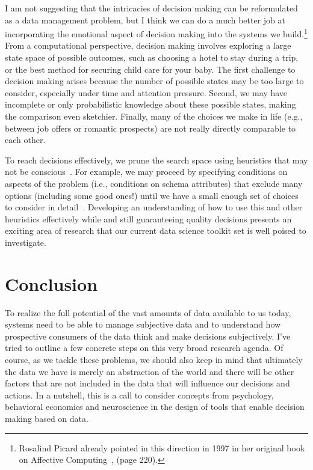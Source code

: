 \documentclass[11pt]{article}
\begin{document}
I am not suggesting that the intricacies of decision making can be reformulated as a data management problem, but I think we can do a much better job at incorporating the emotional aspect of decision making into the systems we build.\footnote{Rosalind Picard already pointed in this direction in 1997 in her original book on Affective Computing~\cite{picard-book}, (page 220).} 
From a computational perspective, decision making involves exploring a large state space of possible outcomes, such as choosing a hotel to stay during a trip, or the best method for securing child care for your baby. The first challenge to decision making arises because the number of possible states may be too large to consider,  especially under time and attention pressure. Second, we may have incomplete or only probabilistic knowledge about these possible states, making the comparison even sketchier. Finally, many of the choices we make in life (e.g., between job offers or romantic prospects) are not really directly comparable  to each other.

To reach decisions effectively, we prune the search space using heuristics that may not be conscious~\cite{nudge}. For example, we may proceed by specifying conditions on aspects of the problem (i.e., conditions on schema attributes) that exclude many options (including some good ones!) until we have a small enough set of choices to consider in detail~\cite{tversky72}.  Developing an understanding of how to use this and other heuristics effectively while and still guaranteeing quality decisions presents an exciting area of research that our current data science toolkit set is well poised to investigate.

\section{Conclusion}
To  realize the full potential of the vast amounts of data available to us today, systems need to be able to manage subjective data and to understand how prospective consumers of the data think and make decisions subjectively. I've tried to outline a few concrete steps on this very broad research agenda. Of course, as we tackle these problems, we should also keep in mind that ultimately the data we have is merely an abstraction of the world and there will be other factors that are not included in the data that will influence our decisions and actions. In a nutshell, this is a call to consider concepts from psychology, behavioral economics and neuroscience in the design of tools that enable decision making based on data. 
\end{document}
